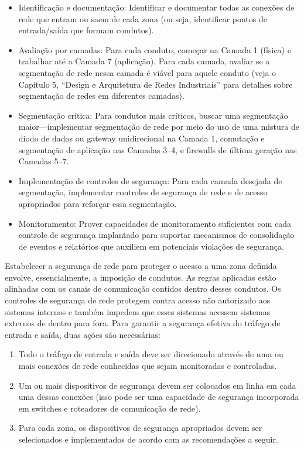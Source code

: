 \begin{itemize}
    \item Identificação e documentação: Identificar e documentar todas as conexões de rede que entram ou saem de cada zona (ou seja, identificar pontos de entrada/saída que formam condutos).
    \item Avaliação por camadas: Para cada conduto, começar na Camada 1 (física) e trabalhar até a Camada 7 (aplicação). Para cada camada, avaliar se a segmentação de rede nessa camada é viável para aquele conduto (veja o Capítulo 5, “Design e Arquitetura de Redes Industriais” para detalhes sobre segmentação de redes em diferentes camadas).
    \item Segmentação crítica: Para condutos mais críticos, buscar uma segmentação maior—implementar segmentação de rede por meio do uso de uma mistura de diodo de dados ou gateway unidirecional na Camada 1, comutação e segmentação de aplicação nas Camadas 3–4, e firewalls de última geração nas Camadas 5–7.
    \item Implementação de controles de segurança: Para cada camada desejada de segmentação, implementar controles de segurança de rede e de acesso apropriados para reforçar essa segmentação.
    \item Monitoramento: Prover capacidades de monitoramento suficientes com cada controle de segurança implantado para suportar mecanismos de consolidação de eventos e relatórios que auxiliem em potenciais violações de segurança.
\end{itemize}

Estabelecer a segurança de rede para proteger o acesso a uma zona definida envolve, essencialmente, a imposição de condutos. As regras aplicadas estão alinhadas com os canais de comunicação contidos dentro desses condutos. Os controles de segurança de rede protegem contra acesso não autorizado aos sistemas internos e também impedem que esses sistemas acessem sistemas externos de dentro para fora. Para garantir a segurança efetiva do tráfego de entrada e saída, duas ações são necessárias:

\begin{enumerate}
    \item Todo o tráfego de entrada e saída deve ser direcionado através de uma ou mais conexões de rede conhecidas que sejam monitoradas e controladas.
    \item Um ou mais dispositivos de segurança devem ser colocados em linha em cada uma dessas conexões (isso pode ser uma capacidade de segurança incorporada em switches e roteadores de comunicação de rede).
    \item Para cada zona, os dispositivos de segurança apropriados devem ser selecionados e implementados de acordo com as recomendações a seguir.
\end{enumerate}

